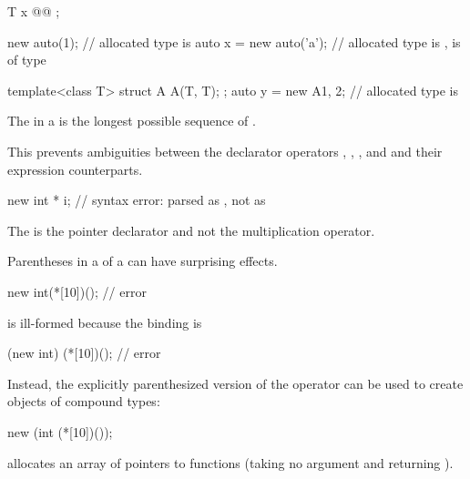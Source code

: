 \begin{codeblock}
T x @\textrm{}@ ;
\end{codeblock}

\begin{example}
\begin{codeblock}
new auto(1);                    // allocated type is 
auto x = new auto('a');         // allocated type is ,  is of type 

template<class T> struct A { A(T, T); };
auto y = new A{1, 2};           // allocated type is 
\end{codeblock}
\end{example}

\pnum
The  in a  is the longest
possible sequence of .
\begin{note}
This prevents ambiguities between the declarator operators \tcode{\&}, \tcode{\&\&},
\tcode{*}, and \tcode{[]} and their expression counterparts.
\end{note}
\begin{example}

\begin{codeblock}
new int * i;                    // syntax error: parsed as , not as 
\end{codeblock}
The \tcode{*} is the pointer declarator and not the multiplication
operator.
\end{example}

\pnum
\begin{note}
%
Parentheses in a  of a 
can have surprising effects.
\begin{example}

\begin{codeblock}
new int(*[10])();               // error
\end{codeblock}

is ill-formed because the binding is

\begin{codeblock}
(new int) (*[10])();            // error
\end{codeblock}

Instead, the explicitly parenthesized version of the 
operator can be used to create objects of compound
types:

\begin{codeblock}
new (int (*[10])());
\end{codeblock}

allocates an array of  pointers to functions (taking no
argument and returning ).
\end{example}
\end{note}

